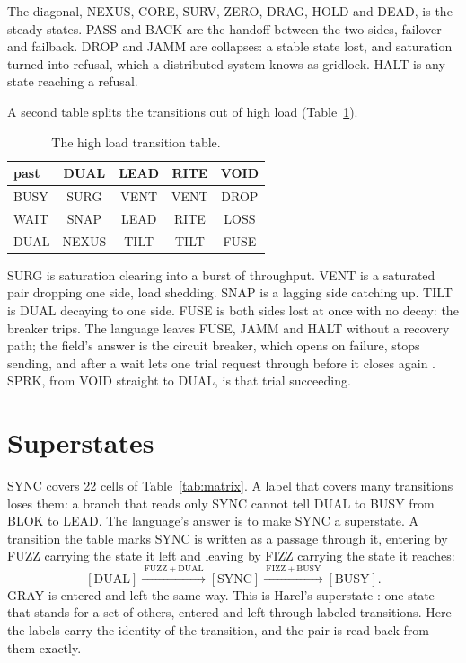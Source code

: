 The diagonal, NEXUS, CORE, SURV, ZERO, DRAG, HOLD and DEAD, is the steady states. PASS and BACK
are the handoff between the two sides, failover and failback. DROP and JAMM are collapses: a
stable state lost, and saturation turned into refusal, which a distributed system knows as
gridlock. HALT is any state reaching a refusal.

A second table splits the transitions out of high load (Table~\ref{tab:energy}).

\begin{table}[h]
\centering
\footnotesize
\begin{tabular}{@{}l c c c c@{}}
\toprule
past & DUAL & LEAD & RITE & VOID \\
\midrule
BUSY & SURG & VENT & VENT & DROP \\
WAIT & SNAP & LEAD & RITE & LOSS \\
DUAL & NEXUS & TILT & TILT & FUSE \\
\bottomrule
\end{tabular}
\caption{The high load transition table.}
\label{tab:energy}
\end{table}

SURG is saturation clearing into a burst of throughput. VENT is a saturated pair dropping one
side, load shedding. SNAP is a lagging side catching up. TILT is DUAL decaying to one side. FUSE
is both sides lost at once with no decay: the breaker trips. The language leaves FUSE, JAMM and
HALT without a recovery path; the field's answer is the circuit breaker, which opens on failure,
stops sending, and after a wait lets one trial request through before it closes again
\cite{src:Nygard}. SPRK, from VOID straight to DUAL, is that trial succeeding.

\section{Superstates}

SYNC covers 22 cells of Table~\ref{tab:matrix}. A label that covers many transitions loses them:
a branch that reads only SYNC cannot tell DUAL to BUSY from BLOK to LEAD. The language's answer
is to make SYNC a superstate. A transition the table marks SYNC is written as a passage through
it, entering by FUZZ carrying the state it left and leaving by FIZZ carrying the state it reaches:
\[
  [\mathrm{DUAL}] \xrightarrow{\ \mathrm{FUZZ+DUAL}\ } [\mathrm{SYNC}]
  \xrightarrow{\ \mathrm{FIZZ+BUSY}\ } [\mathrm{BUSY}].
\]
GRAY is entered and left the same way. This is Harel's superstate \cite{src:Harel}: one state that
stands for a set of others, entered and left through labeled transitions. Here the labels carry
the identity of the transition, and the pair is read back from them exactly.

